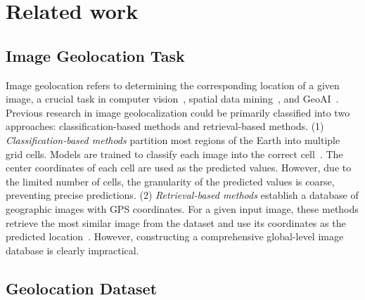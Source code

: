 \section{Related work}
\subsection{Image Geolocation Task}
\label{related1}


Image geolocation refers to determining the corresponding location of a given image, a crucial task in computer vision~\cite{zhu2023difftraj,zhu2023synmob,zhu2024controltraj}, spatial data mining~\cite{zhao2017incorporating,zhao2016exploring,zhang2023promptst,han2023mitigating}, and GeoAI~\cite{zhao2017modeling,zhao2022multi,zhang2023mlpst,zhang2023autostl}.
Previous research in image geolocalization could be primarily classified into two approaches: classification-based methods and retrieval-based methods.
(1) \textit{Classification-based methods} partition most regions of the Earth into multiple grid cells.
Models are trained to classify each image into the correct cell~\cite{clark2023, pramanick2022, muller2018, seo2018, weyand2016}. 
The center coordinates of each cell are used as the predicted values. 
However, due to the limited number of cells, the granularity of the predicted values is coarse, preventing precise predictions.
(2) \textit{Retrieval-based methods} establish a database of geographic images with GPS coordinates. 
For a given input image, these methods retrieve the most similar image from the dataset and use its coordinates as the predicted location~\cite{zhu2022,muller2018, zhang2023,workman2015wide,liu2019lending,Zhou_2024}. 
However, constructing a comprehensive global-level image database is clearly impractical.




\subsection{Geolocation Dataset}

